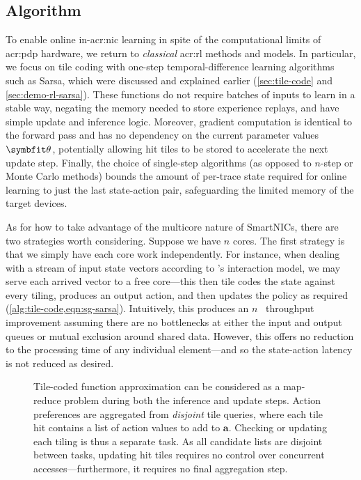 \subsection{Algorithm}\label{sec:opal-algorithm}
%
%
%
To enable online in-\gls{acr:nic} learning in spite of the computational limits of \gls{acr:pdp} hardware, we return to \emph{classical} \gls{acr:rl} methods and models.
In particular, we focus on tile coding with one-step temporal-difference learning algorithms such as Sarsa, which were discussed and explained earlier (\cref{sec:tile-code} and \cref{sec:demo-rl-sarsa}).
These functions do not require batches of inputs to learn in a stable way, negating the memory needed to store experience replays, and have simple update and inference logic.
Moreover, gradient computation is identical to the forward pass and has no dependency on the current parameter values $\wvec{}$, potentially allowing hit tiles to be stored to accelerate the next update step.
Finally, the choice of single-step algorithms (as opposed to $n$-step or Monte Carlo methods) bounds the amount of per-trace state required for online learning to just the last state-action pair, safeguarding the limited memory of the target devices.

As for how to take advantage of the multicore nature of SmartNICs, there are two strategies worth considering.
Suppose we have $n$ cores.
The first strategy is that we simply have each core work independently.
For instance, when dealing with a stream of input state vectors according to \approachshort{}'s interaction model, we may serve each arrived vector to a free core---this then tile codes the state against every tiling, produces an output action, and then updates the policy as required (\cref{alg:tile-code,eqn:sg-sarsa}).
Intuitively, this produces an $n$~\unit{\times} throughput improvement assuming there are no bottlenecks at either the input and output queues or mutual exclusion around shared data.
However, this offers no reduction to the processing time of any individual element---and so the state-action latency is not reduced as desired.

\begin{figure}
	\centering
	\resizebox{0.67\linewidth}{!}{
		
	}
	\caption[A visualisation of how tile-coding can be split into subtasks as a map-reduce problem.]{Tile-coded function approximation can be considered as a map-reduce problem during both the inference and update steps. Action preferences are aggregated from \emph{disjoint} tile queries, where each tile hit contains a list of action values to add to $\mathbf{a}$. Checking or updating each tiling is thus a separate task. As all candidate lists are disjoint between tasks, updating hit tiles requires no control over concurrent accesses---furthermore, it requires no final aggregation step.\label{fig:opal-par-tilecode}}
\end{figure}

